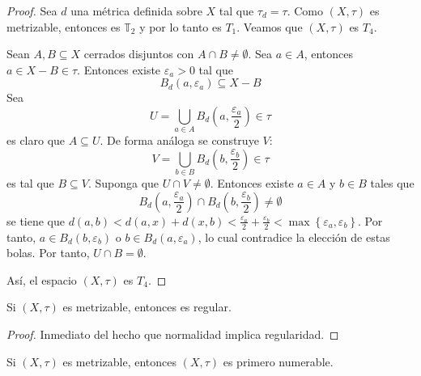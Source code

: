 \documentclass[12pt]{report}
\theoremstyle{largebreak}
\begin{document}
    \begin{proof}
        Sea $d$ una métrica definida sobre $X$ tal que $\tau_d=\tau$. Como $(X,\tau)$ es metrizable, entonces es $\mathbb{T}_2$ y por lo tanto es $T_1$. Veamos que $(X,\tau)$ es $T_4$.

        Sean $A,B\subseteq X$ cerrados disjuntos con $A\cap B\neq\emptyset$. Sea $a\in A$, entonces $a\in X-B\in\tau$. Entonces existe $\varepsilon_a>0$ tal que
        \begin{equation*}
            B_d(a,\varepsilon_a)\subseteq X-B
        \end{equation*}
        Sea
        \begin{equation*}
            U=\bigcup_{ a\in A}B_d\left(a,\frac{\varepsilon_a}{2}\right) \in\tau
        \end{equation*}
        es claro que $A\subseteq U$. De forma análoga se construye $V$:
        \begin{equation*}
            V=\bigcup_{ b\in B}B_d\left(b,\frac{\varepsilon_b}{2}\right) \in\tau
        \end{equation*}
        es tal que $B\subseteq V$. Suponga que $U\cap V\neq\emptyset$. Entonces existe $a\in A$ y $b\in B$ tales que
        \begin{equation*}
            B_d\left(a,\frac{\varepsilon_a}{2}\right)\cap B_d\left(b,\frac{\varepsilon_b}{2}\right)\neq\emptyset
        \end{equation*}
        se tiene que $d(a,b)<d(a,x)+d(x,b)<\frac{\varepsilon_a}{2}+\frac{\varepsilon_b}{2}<\max\left\{\varepsilon_a,\varepsilon_b \right\}$. Por tanto, $a\in B_d(b,\varepsilon_b)$ o $b\in B_d(a,\varepsilon_a)$, lo cual contradice la elección de estas bolas. Por tanto, $U\cap B=\emptyset$.

        Así, el espacio $(X,\tau)$ es $T_4$.
    \end{proof}

    \begin{cor}
        Si $(X,\tau)$ es metrizable, entonces es regular.
    \end{cor}

    \begin{proof}
        Inmediato del hecho que normalidad implica regularidad.
    \end{proof}

    \begin{propo}
        Si $(X,\tau)$ es metrizable, entonces $(X,\tau)$ es primero numerable.
    \end{propo}
\end{document}
